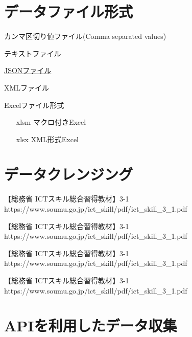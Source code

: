 \section{データファイル形式}%

\MyFrame{\insertsection}
{
  \begin{description}[浮動小数点型]
    \item [csv] カンマ区切り値ファイル(Comma separated values)
    \item [txt] テキストファイル
    \item [json] \href{https://camp.trainocate.co.jp/magazine/whats-json}{JSONファイル}
    \item [xml] XMLファイル
    \item [xls] Excelファイル形式
      \begin{itemize}
        \item [xlsm]マクロ付きExcel
        \item [xlsx]XML形式Excel
      \end{itemize}
  \end{description}
}

\section{データクレンジング}

\MyFrame{}
{

  \MyRef
  {【総務省 ICTスキル総合習得教材】3-1}
  {https://www.soumu.go.jp/ict_skill/pdf/ict_skill_3_1.pdf}
}

\MyFrame{}
{

  \MyRef
  {【総務省 ICTスキル総合習得教材】3-1}
  {https://www.soumu.go.jp/ict_skill/pdf/ict_skill_3_1.pdf}
}

\MyFrame{}
{

  \MyRef
  {【総務省 ICTスキル総合習得教材】3-1}
  {https://www.soumu.go.jp/ict_skill/pdf/ict_skill_3_1.pdf}
}

\MyFrame{}
{

  \MyRef
  {【総務省 ICTスキル総合習得教材】3-1}
  {https://www.soumu.go.jp/ict_skill/pdf/ict_skill_3_1.pdf}
}

\section{APIを利用したデータ収集}

